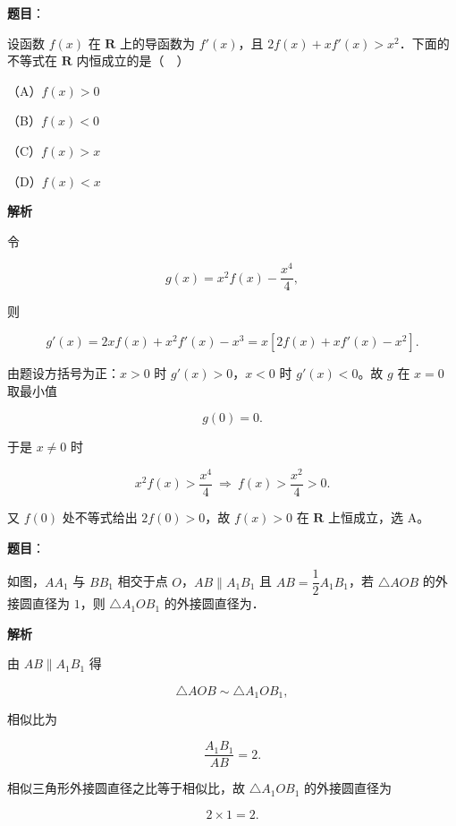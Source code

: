 \begin{answer}

\textbf{题目}：

设函数 $f(x)$ 在 $\mathbf R$ 上的导函数为 $f'(x)$，且 $2f(x)+xf'(x)>x^2$．下面的不等式在 $\mathbf R$ 内恒成立的是（　）

（A）$f(x)>0$

（B）$f(x)<0$

（C）$f(x)>x$

（D）$f(x)<x$

\textbf{解析}

令

\nopagebreak[4]
\[g(x)=x^2f(x)-\frac{x^4}{4},\]

则

\nopagebreak[4]
\[g'(x)=2xf(x)+x^2f'(x)-x^3
=x\left[2f(x)+xf'(x)-x^2\right].\]

由题设方括号为正：$x>0$ 时 $g'(x)>0$，$x<0$ 时 $g'(x)<0$。故 $g$ 在 $x=0$ 取最小值

\nopagebreak[4]
\[g(0)=0 .\]

于是 $x\ne0$ 时

\nopagebreak[4]
\[x^2f(x)>\frac{x^4}{4}\ \Longrightarrow\ f(x)>\frac{x^2}{4}>0 .\]

又 $f(0)$ 处不等式给出 $2f(0)>0$，故 $f(x)>0$ 在 $\mathbf R$ 上恒成立，选 A。


\end{answer}
\begin{answer}

\textbf{题目}：

如图，$AA_1$ 与 $BB_1$ 相交于点 $O$，$AB\parallel A_1B_1$ 且 $AB=\dfrac12A_1B_1$，若 $\triangle AOB$ 的外接圆直径为 $1$，则 $\triangle A_1OB_1$ 的外接圆直径为\gkblank{}．
\nopagebreak[4]
\begin{center}\end{center}
\nopagebreak[4]
\textbf{解析}

由 $AB\parallel A_1B_1$ 得

\nopagebreak[4]
\[\triangle AOB\sim\triangle A_1OB_1,\]

相似比为

\nopagebreak[4]
\[\frac{A_1B_1}{AB}=2 .\]

相似三角形外接圆直径之比等于相似比，故 $\triangle A_1OB_1$ 的外接圆直径为

\nopagebreak[4]
\[2\times1=2 .\]


\end{answer}
